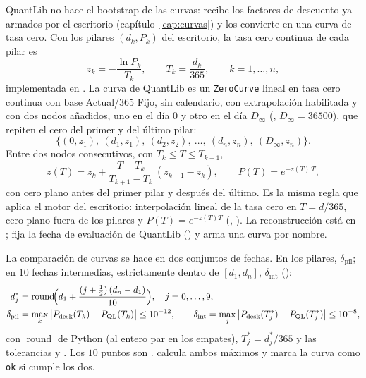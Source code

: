 QuantLib no hace el bootstrap de las curvas: recibe los factores de descuento ya armados por el escritorio
(capítulo~\ref{cap:curvas}) y los convierte en una curva de tasa cero. Con los pilares $(d_k, P_k)$ del escritorio,
la tasa cero continua de cada pilar es
\begin{equation}\label{eq:cap12-cero}
  z_k = -\frac{\ln P_k}{T_k}, \qquad T_k = \frac{d_k}{365}, \qquad k = 1,\dots,n,
\end{equation}
implementada en . La curva de QuantLib es un \texttt{ZeroCurve} lineal
en tasa cero continua con base Actual/365 Fijo, sin calendario, con extrapolación habilitada y con dos nodos
añadidos, uno en el día $0$ y otro en el día $D_\infty$ (, $D_\infty = 36500$),
que repiten el cero del primer y del último pilar:
\begin{equation}\label{eq:cap12-nodos}
  \bigl\{(0, z_1),\ (d_1, z_1),\ (d_2, z_2),\ \dots,\ (d_n, z_n),\ (D_\infty, z_n)\bigr\}.
\end{equation}
Entre dos nodos consecutivos, con $T_k \le T \le T_{k+1}$,
\begin{equation}\label{eq:cap12-interpolacion}
  z(T) = z_k + \frac{T - T_k}{T_{k+1} - T_k}\,(z_{k+1} - z_k),
  \qquad P(T) = e^{-z(T)\,T},
\end{equation}
con cero plano antes del primer pilar y después del último. Es la misma regla que aplica el motor del escritorio:
interpolación lineal de la tasa cero en $T = d/365$, cero plano fuera de los pilares y
$P(T) = e^{-z(T)T}$ (,
). La reconstrucción está en
;  fija la
fecha de evaluación de QuantLib () y arma una curva por nombre.

La comparación de curvas se hace en dos conjuntos de fechas. En los pilares, $\delta_{\mathrm{pil}}$; en
$10$ fechas intermedias, estrictamente dentro de $[d_1, d_n]$, $\delta_{\mathrm{int}}$ ():
\begin{align}
  d^{\ast}_j &= \operatorname{round}\!\Bigl(d_1 + \frac{(j + \tfrac12)\,(d_n - d_1)}{10}\Bigr), \quad j = 0,\dots,9,
  \label{eq:cap12-dias-intermedios}\\
  \delta_{\mathrm{pil}} &= \max_{k}\,\bigl|P_{\mathrm{desk}}(T_k) - P_{\mathrm{QL}}(T_k)\bigr| \le 10^{-12},
  \qquad
  \delta_{\mathrm{int}} = \max_{j}\,\bigl|P_{\mathrm{desk}}(T^{\ast}_j) - P_{\mathrm{QL}}(T^{\ast}_j)\bigr| \le 10^{-8},
  \label{eq:cap12-dif-curvas}
\end{align}
con $\operatorname{round}$ de Python (al entero par en los empates), $T^{\ast}_j = d^{\ast}_j/365$ y las tolerancias
 y . Los $10$ puntos son
.  calcula ambos máximos y
marca la curva como \texttt{ok} si cumple los dos.

